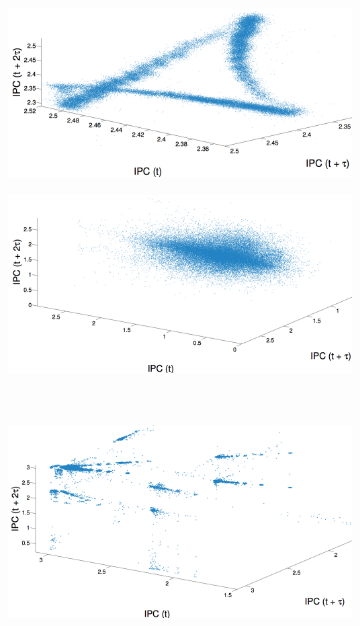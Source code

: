  \begin{figure}
   \centering
\begin{subfigure}{\columnwidth}
    \includegraphics[width=\columnwidth]{figs/colipc3d.png}
    \caption{\col }
    \label{fig:colEmbedding}
  \end{subfigure}%
  
    \begin{subfigure}{\columnwidth}
    \includegraphics[width=\columnwidth]{figs/gcc3dipc.png}
    \caption{\gcc}
    \label{fig:gccEmbedding}
  \end{subfigure} 
  \\
  \begin{subfigure}{\columnwidth}
    \includegraphics[width=\columnwidth]{figs/svd53dipc2.png}
    \caption{\svdfive}
    \label{fig:svdfiveEmbedding}
  \end{subfigure}%
%  
 

\end{figure}
